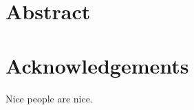 \documentclass[oneside, letterpaper, 12pt, oldfontcommands]{memoir}
\begin{document}
\frontmatter


\thetitlepage
\clearpage

\cleardoublepage

\setcounter{page}{1}

\section{Abstract}
\uwabstract
\cleardoublepage

\section{Acknowledgements}

Nice people are nice.

\clearpage

\tableofcontents* %

\makeatletter
     \renewcommand*\l@figure{\@dottedtocline{1}{1em}{3.2em}}
\makeatother

 \clearpage
 \listoffigures  %
 \listoftables   %

\mainmatter





% 
% 
% 
% 
% 
% 
% 
% 

% 
% 

%

%

%


\end{document}
